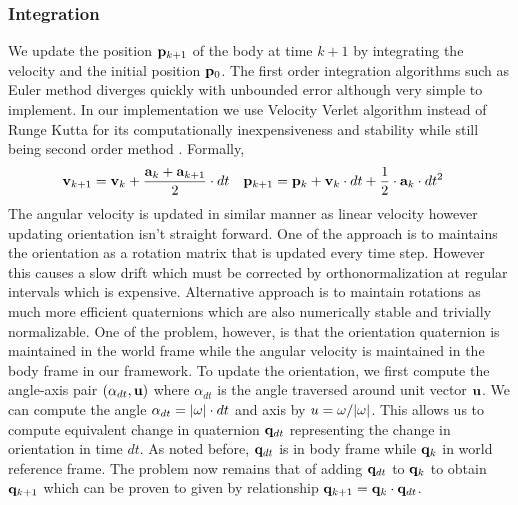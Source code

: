 \documentclass[graybox]{svmult}
\begin{document}
\subsubsection{Integration}
We update the position ${\bf p}_{k+1}$ of the body at time $k+1$ by integrating the velocity and the initial position ${\bf p}_{0}$. The first order integration algorithms such as Euler method diverges quickly with unbounded error although very simple to implement. In our implementation we use Velocity Verlet algorithm instead of Runge Kutta for its computationally inexpensiveness and stability while still being second order method \cite{Herman2017}. Formally, 
\begin{align*}
  {\bf v}_{k+1} &= {\bf v}_{k} + \frac{{\bf a}_{k} + {\bf a}_{k+1}}{2} \cdot dt &
  {\bf p}_{k+1} &= {\bf p}_{k} + {\bf v}_{k} \cdot dt + \frac{1}{2} \cdot {\bf a}_{k} \cdot dt^2
\end{align*}
The angular velocity is updated in similar manner as linear velocity however updating orientation isn't straight forward. One of the approach is to maintains the orientation as a rotation matrix that is updated every time step. However this causes a slow drift which must be corrected by orthonormalization at regular intervals which is expensive. Alternative approach is to maintain rotations as much more efficient quaternions which are also numerically stable and trivially normalizable. One of the problem, however, is that the orientation quaternion is maintained in the world frame while the angular velocity is maintained in the body frame in our framework. To update the orientation, we first compute the angle-axis pair $(\alpha_{dt}, {\bf u})$ where $\alpha_{dt}$ is the angle traversed around unit vector ${\bf u}$. We can compute the angle $\alpha_{dt} = |{\bf \omega}| \cdot dt$ and axis by $u = {\bf \omega} / |\omega|$. This allows us to compute equivalent change in quaternion ${\bf q}_{dt}$ representing the change in orientation in time $dt$. As noted before, ${\bf q}_{dt}$ is in body frame while ${\bf q}_{k}$ in world reference frame. The problem now remains that of adding ${\bf q}_{dt}$ to ${\bf q}_{k}$ to obtain ${\bf q}_{k+1}$ which can be proven to given by relationship ${\bf q}_{k+1} = {\bf q}_{k} \cdot {\bf q}_{dt}$.
%
%
%
%
\end{document}
